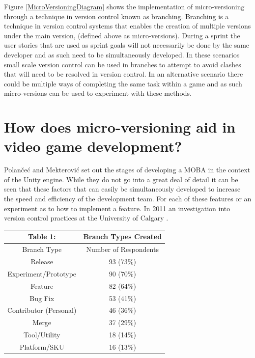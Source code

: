 \documentclass{scrartcl}
\begin{document}
Figure \ref{MicroVersioningDiagram} shows the implementation  of micro-versioning through a technique in version control known as branching. Branching is a technique in version control systems that enables the creation of multiple versions under the main version, (defined above as micro-versions)\cite{chacon2014pro}. During a sprint the user stories that are used as sprint goals will not necessarily be done by the same developer and as such need to be simultaneously developed. In these scenarios small scale version control can be used in branches to attempt to avoid clashes that will need to be resolved in version control. In an alternative scenario there could be multiple ways of completing the same task within a game and as such micro-versions can be used to experiment with these methods.


\section{How does micro-versioning aid in video game development?}
Polan{\v{c}}e{\'c} and Mekterovi{\'c} set out the stages of developing a MOBA in the context of the Unity engine. \cite{polanvcec2017developing} While they do not go into a great deal of detail it can be seen that these factors that can easily be simultaneously developed to increase the speed and efficiency of the development team. For each of these features or an experiment as to how to implement a feature. In 2011 an investigation into version control practices at the University of Calgary \cite{phillips2011branching}.
	\begin{center}
	
	\begin{tabular}{ c c }
		Table 1: & Branch Types Created \cite{phillips2011branching} \\
		\hline
 		Branch Type & Number of Respondents   \\ 
 		\hline
 		Release & 93 (73\%)   \\  
 		Experiment/Prototype & 90 (70\%)\\  
 		Feature & 82 (64\%)     \\  
 		Bug Fix & 53 (41\%)     \\  
 		Contributor (Personal) & 46 (36\%)     \\  
 		Merge & 37 (29\%)     \\  
 		Tool/Utility & 18 (14\%)     \\  
 		Platform/SKU &  16 (13\%)  \\
 		\hline     
	\end{tabular}

	\end{center}
\end{document}
